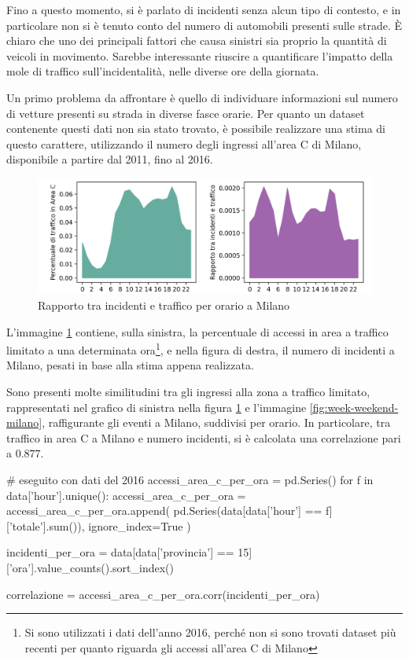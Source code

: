 \documentclass[a4paper]{report}
\begin{document}
Fino a questo momento, si è parlato di incidenti senza alcun tipo di contesto, 
e in 
particolare non si è tenuto conto del numero di automobili presenti sulle strade. 
\`E chiaro che uno dei principali fattori che causa sinistri sia proprio 
la quantità di veicoli in movimento. 
Sarebbe interessante riuscire a quantificare l'impatto della mole di traffico 
sull'incidentalità, nelle diverse ore della giornata.

Un primo problema da affrontare è quello di individuare informazioni sul 
numero di vetture presenti su strada in diverse fasce orarie. 
Per quanto un dataset contenente questi dati non sia stato trovato, 
è possibile realizzare una stima di questo carattere, 
utilizzando il numero degli ingressi all'area C di Milano, 
disponibile a partire dal 2011, fino al 2016. 

\begin{figure}
    \includegraphics[width=\linewidth]{../src/area_c/rapporto_orario.png}
    \caption{Rapporto tra incidenti e traffico per orario a Milano}
    \label{fig:rapporto-incidenti-traffico}
\end{figure}

L'immagine \ref{fig:rapporto-incidenti-traffico} contiene, sulla sinistra, 
la percentuale di accessi in area a traffico limitato a una determinata 
ora\footnote{Si sono utilizzati i dati dell'anno 2016, perché non si sono trovati 
dataset più recenti per quanto riguarda gli accessi all'area C di Milano}, 
e nella figura di destra, il numero di incidenti a Milano, pesati in base alla 
stima appena realizzata. 

Sono presenti molte similitudini tra gli ingressi alla zona a traffico limitato, 
rappresentati nel grafico di sinistra nella 
figura \ref{fig:rapporto-incidenti-traffico} e l'immagine \ref{fig:week-weekend-milano}, 
raffigurante gli eventi a Milano, suddivisi per orario. 
In particolare, tra traffico in area C a Milano e 
numero incidenti, si è calcolata una correlazione pari a $0.877$. 

\begin{code}
# eseguito con dati del 2016
accessi_area_c_per_ora = pd.Series()
for f in data['hour'].unique():
    accessi_area_c_per_ora = accessi_area_c_per_ora.append(
        pd.Series(data[data['hour'] == f]['totale'].sum()), 
        ignore_index=True
        )

incidenti_per_ora = data[data['provincia'] == 15]['ora'].value_counts().sort_index()

correlazione = accessi_area_c_per_ora.corr(incidenti_per_ora)
\end{code}
\end{document}
